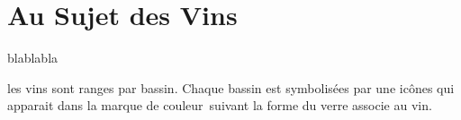 \setlength{\ellipsisgap}{0.02em}


\newpage 
\fancyhead[LE]{\bfseries\nouppercase{\leftmark} } 
\fancyhead[RO]{\bfseries\nouppercase{\leftmark} } 
\fancyhead[LO]{\bfseries\nouppercase{\rightmark} }
\fancyhead[RE]{\bfseries\nouppercase{\rightmark} }

\section{Au Sujet des Vins}

blablabla

les vins sont ranges par bassin. Chaque bassin est symbolisées par une icônes qui apparait dans la marque de couleur suivant la forme du verre associe au vin.
\medskip

